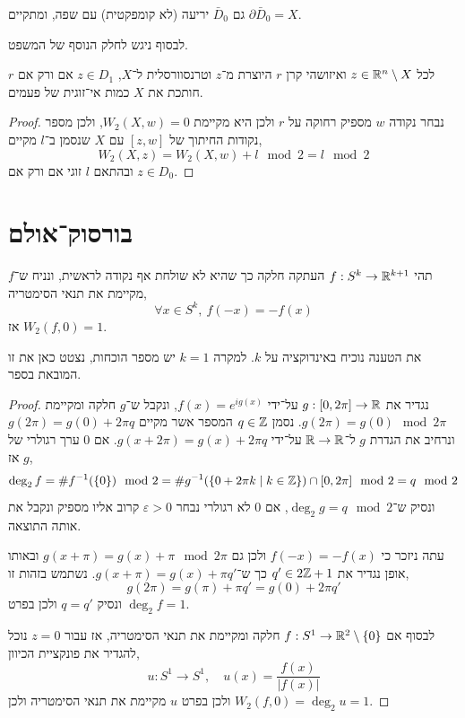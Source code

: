 \begin{corollary}
	גם $\bar{D}_0$ יריעה (לא קומפקטית) עם שפה, ומתקיים $\partial \bar{D}_0 = X$.
\end{corollary}
לבסוף ניגש לחלק הנוסף של המשפט.
\begin{corollary}
	לכל $z \in \mathbb{R}^n \setminus X$ ואיזושהי קרן $r$ היוצרת מ־$z$ וטרנסוורסלית ל־$X$, $z \in D_1$ אם ורק אם $r$ חותכת את $X$ כמות אי־זוגית של פעמים.
\end{corollary}
\begin{proof}
	נבחר נקודה $w$ מספיק רחוקה על $r$ ולכן היא מקיימת $W_2(X, w) = 0$, ולכן מספר נקודות החיתוך של $[z, w]$ עם $X$ שנסמן ב־$l$ מקיים,
	\[
		W_2(X, z)
		= W_2(X, w) + l \mod 2
		= l \mod 2
	\]
	ובהתאם $l$ זוגי אם ורק אם $z \in D_0$.
\end{proof}

\section{בורסוק־אולם}
\begin{theorem}
	תהי $f : S^k \to \mathbb{R}^{k + 1}$ העתקה חלקה כך שהיא לא שולחת אף נקודה לראשית,
	ונניח ש־$f$ מקיימת את תנאי הסימטריה,
	\[
		\forall x \in S^k,\ 
		f(-x) = - f(x)
	\]
	אז $W_2(f, 0) = 1$.
\end{theorem}
את הטענה נוכיח באינדוקציה על $k$.
למקרה $k = 1$ יש מספר הוכחות, נצטט כאן את זו המובאת בספר.
\begin{proof}
	נגדיר את $g : [0, 2 \pi] \to \mathbb{R}$ על־ידי $f(x) = e^{i g(x)}$, ונקבל ש־$g$ חלקה ומקיימת $g(2 \pi) = g(0) \mod 2 \pi$.
	נסמן $q \in \mathbb{Z}$ המספר אשר מקיים $g(2 \pi) = g(0) + 2 \pi q$ ונרחיב את הגדרת $g$ ל־$\mathbb{R} \to \mathbb{R}$ על־ידי $g(x + 2 \pi) = g(x) + 2 \pi q$.
	אם $0$ ערך רגולרי של $g$ אז,
	\[
		\deg_2 f
		= \# f^{-1}(\{ 0 \}) \mod 2
		= \# g^{-1}(\{ 0 + 2 \pi k \mid k \in \mathbb{Z} \}) \cap [0, 2 \pi] \mod 2
		= q \mod 2
	\]
	ונסיק ש־$\deg_2 g = q \mod 2$, אם $0$ לא רגולרי נבחר $\varepsilon > 0$ קרוב אליו מספיק ונקבל את אותה התוצאה.

	עתה ניזכר כי $f(-x) = -f(x)$ ולכן גם $g(x + \pi) = g(x) + \pi \mod 2 \pi$ ובאותו אופן נגדיר את $q' \in 2\mathbb{Z} + 1$ כך ש־$g(x + \pi) = g(x) + \pi q'$.
	נשתמש בזהות זו,
	\[
		g(2 \pi)
		= g(\pi) + \pi q'
		= g(0) + 2 \pi q'
	\]
	ונסיק $q = q'$ ולכן בפרט $\deg_2 f = 1$.

	לבסוף אם $f : S^1 \to \mathbb{R}^2 \setminus \{ 0 \}$ חלקה ומקיימת את תנאי הסימטריה, אז עבור $z = 0$ נוכל להגדיר את פונקציית הכיוון,
	\[
		u : S^1 \to S^1,
		\quad
		u(x)
		= \frac{f(x)}{|f(x)|}
	\]
	ולכן בפרט $u$ מקיימת את תנאי הסימטריה ולכן $W_2(f, 0) = \deg_2 u = 1$.
\end{proof}
